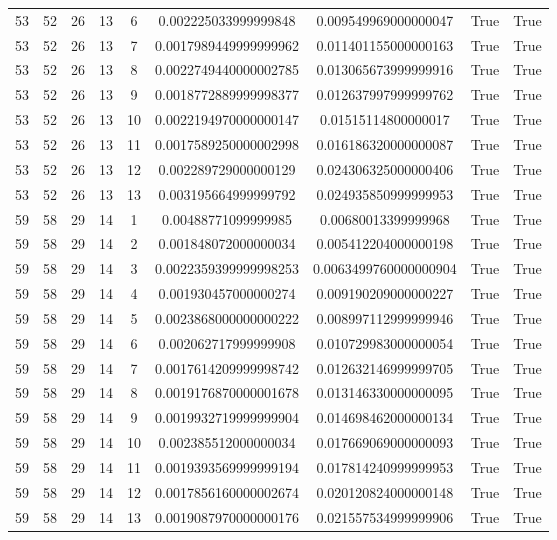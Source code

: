 \documentclass[a4paper,11pt]{article}
\begin{document}
\begin{landscape}
\begin{longtable}{ccccccccc}
53 & 52 & 26 & 13 & 6 & 0.002225033999999848 & 0.009549969000000047 & True & True \\
53 & 52 & 26 & 13 & 7 & 0.0017989449999999962 & 0.011401155000000163 & True & True \\
53 & 52 & 26 & 13 & 8 & 0.0022749440000002785 & 0.013065673999999916 & True & True \\
53 & 52 & 26 & 13 & 9 & 0.0018772889999998377 & 0.012637997999999762 & True & True \\
53 & 52 & 26 & 13 & 10 & 0.0022194970000000147 & 0.01515114800000017 & True & True \\
53 & 52 & 26 & 13 & 11 & 0.0017589250000002998 & 0.016186320000000087 & True & True \\
53 & 52 & 26 & 13 & 12 & 0.002289729000000129 & 0.024306325000000406 & True & True \\
53 & 52 & 26 & 13 & 13 & 0.003195664999999792 & 0.024935850999999953 & True & True \\
59 & 58 & 29 & 14 & 1 & 0.00488771099999985 & 0.00680013399999968 & True & True \\
59 & 58 & 29 & 14 & 2 & 0.001848072000000034 & 0.005412204000000198 & True & True \\
59 & 58 & 29 & 14 & 3 & 0.0022359399999998253 & 0.0063499760000000904 & True & True \\
59 & 58 & 29 & 14 & 4 & 0.001930457000000274 & 0.009190209000000227 & True & True \\
59 & 58 & 29 & 14 & 5 & 0.0023868000000000222 & 0.008997112999999946 & True & True \\
59 & 58 & 29 & 14 & 6 & 0.002062717999999908 & 0.010729983000000054 & True & True \\
59 & 58 & 29 & 14 & 7 & 0.0017614209999998742 & 0.012632146999999705 & True & True \\
59 & 58 & 29 & 14 & 8 & 0.0019176870000001678 & 0.013146330000000095 & True & True \\
59 & 58 & 29 & 14 & 9 & 0.0019932719999999904 & 0.014698462000000134 & True & True \\
59 & 58 & 29 & 14 & 10 & 0.002385512000000034 & 0.017669069000000093 & True & True \\
59 & 58 & 29 & 14 & 11 & 0.0019393569999999194 & 0.017814240999999953 & True & True \\
59 & 58 & 29 & 14 & 12 & 0.0017856160000002674 & 0.020120824000000148 & True & True \\
59 & 58 & 29 & 14 & 13 & 0.0019087970000000176 & 0.021557534999999906 & True & True \\

\end{longtable}
\end{landscape}
\end{document}
